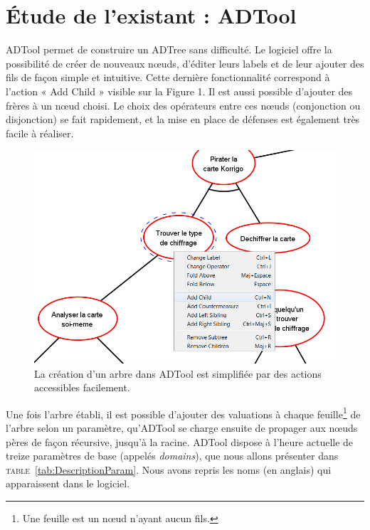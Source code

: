\section{\'Etude de l'existant : ADTool}


	\label{sec:adtool}


	ADTool permet de construire un ADTree sans difficulté. Le logiciel offre la possibilité de créer de nouveaux nœuds, d'éditer leurs labels et de leur ajouter des fils de façon simple et intuitive. Cette dernière fonctionnalité correspond à l'action « Add Child » visible sur la Figure 1. Il est aussi possible d'ajouter des frères à un nœud choisi. Le choix des opérateurs entre ces nœuds (conjonction ou disjonction)  se fait rapidement, et la mise en place de défenses est également très facile à réaliser. 
	
	\begin{figure}[h]
        \centering
        \includegraphics[width=1\textwidth]{figure/adtool_add_child.png}
        \caption{La création d'un arbre dans ADTool est simplifiée par des actions accessibles facilement.}
        \label{fig:arbre_exemple_1}
    \end{figure}
	
	Une fois l'arbre établi, il est possible d'ajouter des valuations à chaque feuille\footnote{Une feuille est un nœud n'ayant aucun fils.} de l'arbre selon un paramètre, qu'ADTool se charge ensuite de propager aux nœuds pères de façon récursive, jusqu'à la racine. ADTool dispose à l'heure actuelle de treize paramètres de base (appelés \textit{domains}), que nous allons présenter dans \textsc{table}~\ref{tab:DescriptionParam}. Nous avons repris les noms (en anglais) qui apparaissent dans le logiciel. 
					
